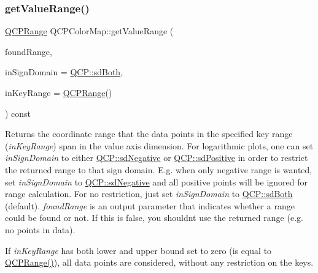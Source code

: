 \subsubsection{\texorpdfstring{getValueRange()}{getValueRange()}}
{\footnotesize\ttfamily \mbox{\hyperlink{class_q_c_p_range}{Q\+C\+P\+Range}} Q\+C\+P\+Color\+Map\+::get\+Value\+Range (\begin{DoxyParamCaption}\item[{bool \&}]{found\+Range,  }\item[{\mbox{\hyperlink{namespace_q_c_p_afd50e7cf431af385614987d8553ff8a9}{Q\+C\+P\+::\+Sign\+Domain}}}]{in\+Sign\+Domain = {\ttfamily \mbox{\hyperlink{namespace_q_c_p_afd50e7cf431af385614987d8553ff8a9aa38352ef02d51ddfa4399d9551566e24}{Q\+C\+P\+::sd\+Both}}},  }\item[{const \mbox{\hyperlink{class_q_c_p_range}{Q\+C\+P\+Range}} \&}]{in\+Key\+Range = {\ttfamily \mbox{\hyperlink{class_q_c_p_range}{Q\+C\+P\+Range}}()} }\end{DoxyParamCaption}) const\hspace{0.3cm}{\ttfamily [virtual]}}

Returns the coordinate range that the data points in the specified key range ({\itshape in\+Key\+Range}) span in the value axis dimension. For logarithmic plots, one can set {\itshape in\+Sign\+Domain} to either \mbox{\hyperlink{namespace_q_c_p_afd50e7cf431af385614987d8553ff8a9a2d18af0bc58f6528d1e82ce699fe4829}{Q\+C\+P\+::sd\+Negative}} or \mbox{\hyperlink{namespace_q_c_p_afd50e7cf431af385614987d8553ff8a9a584784b75fb816abcc627cf743bb699f}{Q\+C\+P\+::sd\+Positive}} in order to restrict the returned range to that sign domain. E.\+g. when only negative range is wanted, set {\itshape in\+Sign\+Domain} to \mbox{\hyperlink{namespace_q_c_p_afd50e7cf431af385614987d8553ff8a9a2d18af0bc58f6528d1e82ce699fe4829}{Q\+C\+P\+::sd\+Negative}} and all positive points will be ignored for range calculation. For no restriction, just set {\itshape in\+Sign\+Domain} to \mbox{\hyperlink{namespace_q_c_p_afd50e7cf431af385614987d8553ff8a9aa38352ef02d51ddfa4399d9551566e24}{Q\+C\+P\+::sd\+Both}} (default). {\itshape found\+Range} is an output parameter that indicates whether a range could be found or not. If this is false, you shouldn\textquotesingle{}t use the returned range (e.\+g. no points in data).

If {\itshape in\+Key\+Range} has both lower and upper bound set to zero (is equal to {\ttfamily \mbox{\hyperlink{class_q_c_p_range}{Q\+C\+P\+Range()}}}), all data points are considered, without any restriction on the keys.

